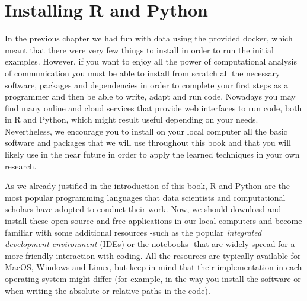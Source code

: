 \section{Installing R and Python}
\label{sec:installing}

In the previous chapter we had fun with data using the provided docker, which meant that there were very few things to install in order to run the initial examples. However, if you want to enjoy all the power of computational analysis of communication you must be able to install from scratch all the necessary software, packages and dependencies in order to complete your first steps as a programmer and then be able to write, adapt and run code. Nowadays you may find many online and cloud services that provide web interfaces to run code, both in R and Python, which might result useful depending on your needs. Nevertheless, we encourage you to install on your local computer all the basic software and packages that we will use throughout this book and that you will likely use in the near future in order to apply the learned techniques in your own research.  

As we already justified in the introduction of this book, R and Python are the most popular programming languages that data scientists and computational scholars have adopted to conduct their work.  Now, we should download and install these open-source and free applications in our local computers and become familiar with some additional resources -such as the popular \emph{integrated development environment} (IDEs) or the notebooks- that are widely spread for a more friendly interaction with coding. All the resources are typically available for MacOS, Windows and Linux, but keep in mind that their implementation in each operating system might differ (for example, in the way you install the software or when writing the absolute or relative paths in the code). 

